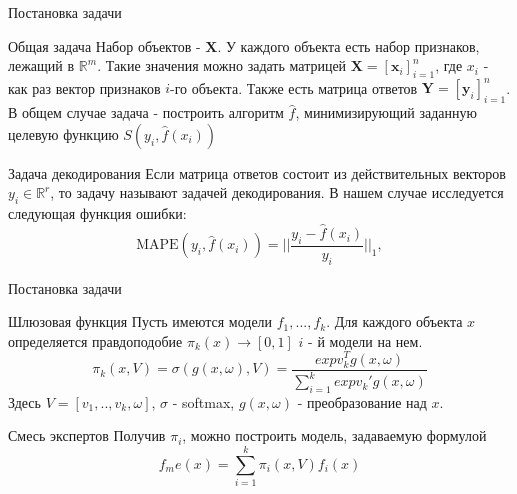 \documentclass{beamer}
\begin{document}
\begin{frame}{Постановка задачи}
\begin{block}{Общая задача}
Набор объектов - $\mathbf{X}$.  У каждого объекта есть набор признаков,  лежащий в $\mathbb{R}^m$.  Такие значения можно задать матрицей 
$\mathbf{X} = [\mathbf{x}_i]_{i = 1}^n$, где $x_i$ -  как раз вектор признаков $i$-го объекта. Также есть матрица ответов $\mathbf{Y} = [\mathbf{y}_i]_{i = 1}^n$.  В общем случае задача - построить алгоритм $\hat{f}$, минимизирующий заданную целевую функцию $S(y_i, \hat{f}(x_i)) $
\end{block}


\begin{block}{Задача декодирования}
Если матрица ответов состоит из действительных векторов  $y_i \in \mathbb{R}^r$, то задачу называют задачей декодирования. В нашем случае исследуется следующая функция ошибки:
$$\text{MAPE}(y_i, \hat{f}(x_i)) = ||\frac{ y_i - \hat{f}(x_i)}{y_i} ||_1,$$
\end{block}

\end{frame}

\begin{frame}{Постановка задачи}


\begin{block}{Шлюзовая функция}
Пусть имеются модели $f_1, ..., f_k$.   Для каждого объекта $x$ определяется правдоподобие $\pi_k(x) \rightarrow [0, 1]$ $i$ - й модели на нем. 
$$ \pi_k(x, V) = \sigma(g(x, \omega), V) = \frac{exp v^T_k g(x, \omega)}{\sum\limits_{i = 1}^k exp v_k' g(x, \omega)}$$
Здесь  $V = [v_1, .., v_k, \omega]$, $\sigma$ - softmax, $g(x, \omega)$ - преобразование над $x$.
\end{block}


\begin{block}{Смесь экспертов}
Получив $\pi_i$, можно построить модель, задаваемую формулой 
$$ f_me(x) = \sum\limits_{i =1}^{k} \pi_i(x, V) f_i(x)$$
\end{block}

\end{frame}
\end{document}
